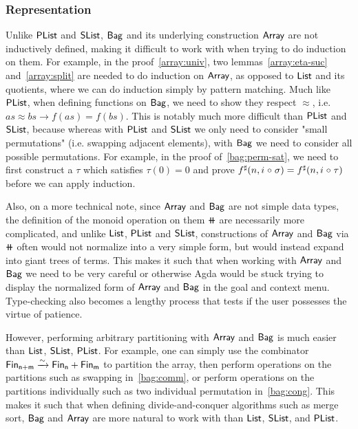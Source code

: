 \subsubsection{Representation}\label{bag:rep}
Unlike $\operatorname{\mathsf{PList}}$ and $\operatorname{\mathsf{SList}}$, $\operatorname{\mathsf{Bag}}$ and its underlying construction $\operatorname{\mathsf{Array}}$ are not inductively defined,
making it difficult to work with when trying to do induction on them. For example,
in the proof~\cref{array:univ}, two lemmas~\cref{array:eta-suc} and~\cref{array:split} are needed to do
induction on $\operatorname{\mathsf{Array}}$, as opposed to $\operatorname{\mathsf{List}}$ and its quotients, where we can do induction simply by
pattern matching. Much like $\operatorname{\mathsf{PList}}$, when defining functions on $\operatorname{\mathsf{Bag}}$, we need to show they respect
$\approx$, i.e. $as \approx bs \to f(as) = f(bs)$. This is notably much more difficult than
$\operatorname{\mathsf{PList}}$ and $\operatorname{\mathsf{SList}}$, because whereas with $\operatorname{\mathsf{PList}}$ and $\operatorname{\mathsf{SList}}$ we only need to consider "small permutations"
(i.e. swapping adjacent elements), with $\operatorname{\mathsf{Bag}}$ we need to consider all possible permutations. For example,
in the proof of~\cref{bag:perm-sat}, we need to first construct a $\tau$ which satisfies $\tau(0) = 0$ and prove
${f}^{\sharp}(n, i \mathrel{\circ} \sigma) = {f}^{\sharp}(n, i \mathrel{\circ} \tau)$ before we can apply induction.

Also, on a more technical note, since $\operatorname{\mathsf{Array}}$ and $\operatorname{\mathsf{Bag}}$ are not simple data types, the definition of
the monoid operation on them $\doubleplus$ are necessarily more complicated, and unlike $\operatorname{\mathsf{List}}$, $\operatorname{\mathsf{PList}}$
and $\operatorname{\mathsf{SList}}$, constructions of $\operatorname{\mathsf{Array}}$ and $\operatorname{\mathsf{Bag}}$ via $\doubleplus$ often would not normalize into a
very simple form, but would instead expand into giant trees of terms. This makes it such that when working
with $\operatorname{\mathsf{Array}}$ and $\operatorname{\mathsf{Bag}}$ we need to be very careful or otherwise Agda would be stuck trying to display
the normalized form of $\operatorname{\mathsf{Array}}$ and $\operatorname{\mathsf{Bag}}$ in the goal and context menu. Type-checking also becomes a lengthy
process that tests if the user possesses the virtue of patience.

However, performing arbitrary partitioning with $\operatorname{\mathsf{Array}}$ and $\operatorname{\mathsf{Bag}}$ is much easier than
$\operatorname{\mathsf{List}}$, $\operatorname{\mathsf{SList}}$, $\operatorname{\mathsf{PList}}$. For example,
one can simply use the combinator $\Fin[n+m] \xto{\sim} \Fin[n] + \Fin[m]$ to partition the array,
then perform operations on the partitions such as swapping in~\cref{bag:comm},
or perform operations on the partitions individually such as two individual permutation in~\cref{bag:cong}.
This makes it such that when defining divide-and-conquer algorithms such as merge sort,
$\operatorname{\mathsf{Bag}}$ and $\operatorname{\mathsf{Array}}$ are more natural to work with than $\operatorname{\mathsf{List}}$, $\operatorname{\mathsf{SList}}$, and $\operatorname{\mathsf{PList}}$.
